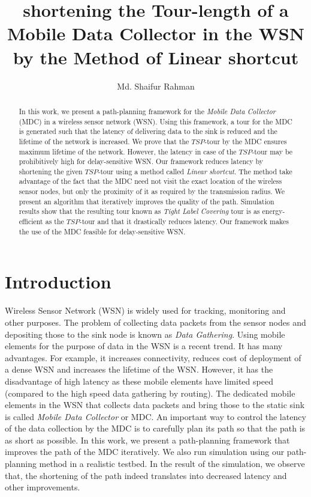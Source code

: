 \documentclass{llncs}
\title{shortening the Tour-length of a Mobile Data Collector in the WSN by the Method of Linear
shortcut}
\author{Md. Shaifur Rahman} %
\institute{Bangladesh University of Engineering \& technology, Dhaka, Bangladesh \\
 \email{shaifur.at.buet@gmail.com}
}
\begin{document}
\maketitle
\begin{abstract}
In this work, we present a path-planning framework for the \textit{Mobile Data Collector} (MDC) in a
wireless sensor network (WSN). Using this framework, a tour for the MDC is generated such that the
latency of delivering data to the sink is reduced and the lifetime of the network is increased. We
prove that the $TSP$-tour by the MDC ensures maximum lifetime of the network. However, the latency
in case of the $TSP$-tour may be prohibitively high for delay-sensitive WSN. Our framework reduces
latency by shortening the given $TSP$-tour using a method called \textit{Linear shortcut}. The
method take advantage of the fact that the MDC need not visit the exact location of the wireless
sensor nodes, but only the proximity of it as required by the transmission radius. We present an
algorithm that iteratively improves the quality of the path. Simulation results show that the
resulting tour known as \textit{Tight Label Covering} tour is as energy-efficient as the $TSP$-tour
and that it drastically reduces latency. Our framework makes the use of the MDC feasible for  delay-sensitive WSN.
\end{abstract}

\section{Introduction}
Wireless Sensor Network (WSN) is widely used for tracking, monitoring and other
purposes. The problem of collecting data packets from the sensor nodes and depositing those to the
sink node is known as \textit{Data Gathering}. Using mobile elements for the purpose of  data in
the WSN is a recent trend. It has many advantages. For example, it increases connectivity, reduces
cost of deployment of a dense WSN and increases the lifetime of the WSN. However, it has the
disadvantage of high latency as these mobile elements have limited speed (compared to the high
speed data gathering by routing).
The dedicated mobile elements in the WSN that collects data packets and bring those 
to the static sink is called \textit{Mobile Data Collector} or MDC. An important way to control the 
latency of the data collection by the MDC is to carefully plan its path so that the path is as short
as possible. In this work, we present a path-planning framework that improves the path of the MDC 
iteratively. We also run simulation using our path-planning method in a realistic testbed. In
the result of the simulation, we observe that, the shortening of the path indeed translates into
decreased latency and other improvements.
\end{document}
